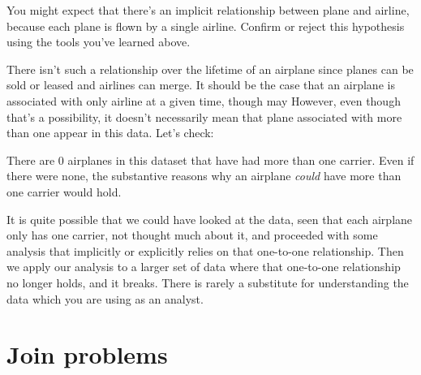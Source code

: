 \documentclass[]{book}
\newenvironment{Shaded}{\begin{snugshade}}{\end{snugshade}}
\newcommand{\CommentTok}[1]{\textcolor[rgb]{0.56,0.35,0.01}{\textit{#1}}}
\newcommand{\DecValTok}[1]{\textcolor[rgb]{0.00,0.00,0.81}{#1}}
\newcommand{\KeywordTok}[1]{\textcolor[rgb]{0.13,0.29,0.53}{\textbf{#1}}}
\newcommand{\NormalTok}[1]{#1}
\newcommand{\OperatorTok}[1]{\textcolor[rgb]{0.81,0.36,0.00}{\textbf{#1}}}
\newcommand{\StringTok}[1]{\textcolor[rgb]{0.31,0.60,0.02}{#1}}
\theoremstyle{definition}
\theoremstyle{definition}
\theoremstyle{definition}
\theoremstyle{remark}
\begin{document}
You might expect that there's an implicit relationship between plane and
airline, because each plane is flown by a single airline. Confirm or
reject this hypothesis using the tools you've learned above.

There isn't such a relationship over the lifetime of an airplane since
planes can be sold or leased and airlines can merge. It should be the
case that an airplane is associated with only airline at a given time,
though may However, even though that's a possibility, it doesn't
necessarily mean that plane associated with more than one appear in this
data. Let's check:

\begin{Shaded}
\end{Shaded}

There are 0 airplanes in this dataset that have had more than one
carrier. Even if there were none, the substantive reasons why an
airplane \emph{could} have more than one carrier would hold.

It is quite possible that we could have looked at the data, seen that
each airplane only has one carrier, not thought much about it, and
proceeded with some analysis that implicitly or explicitly relies on
that one-to-one relationship. Then we apply our analysis to a larger set
of data where that one-to-one relationship no longer holds, and it
breaks. There is rarely a substitute for understanding the data which
you are using as an analyst.

\hypertarget{join-problems}{%
\section{Join problems}\label{join-problems}}
\end{document}
